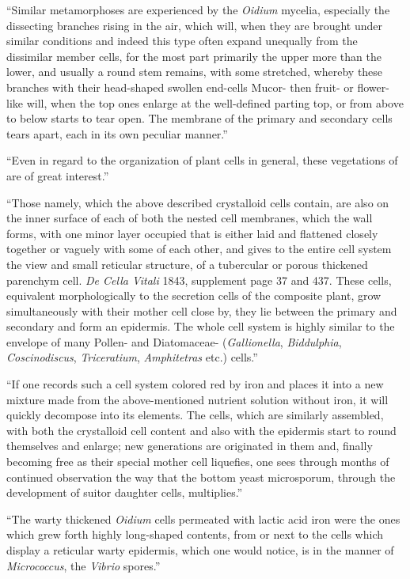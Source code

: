 \documentclass[a4paper, 12pt, oneside]{article}
\begin{document}
``Similar metamorphoses are experienced by the \emph{Oidium} mycelia, especially the dissecting branches rising in the air, which will, when they are brought under similar conditions and indeed this type often expand unequally from the dissimilar member cells, for the most part primarily the upper more than the lower, and usually a round stem remains, with some stretched, whereby these branches with their head-shaped swollen end-cells Mucor- then fruit- or flower-like will, when the top ones enlarge at the well-defined parting top, or from above to below starts to tear open. The membrane of the primary and secondary cells tears apart, each in its own peculiar manner.''

``Even in regard to the organization of plant cells in general, these vegetations of are of great interest.''

``Those namely, which the above described crystalloid cells contain, are also on the inner surface of each of both the nested cell membranes, which the wall forms, with one minor layer occupied that is either laid and flattened closely together or vaguely with some of each other, and gives to the entire cell system the view and small reticular structure, of a tubercular or porous thickened parenchym cell. \emph{De Cella Vitali} 1843, supplement page 37 and 437. These cells, equivalent morphologically to the secretion cells of the composite plant, grow simultaneously with their mother cell close by, they lie between the primary and secondary and form an epidermis. The whole cell system is highly similar to the envelope of many Pollen- and Diatomaceae- (\emph{Gallionella}, \emph{Biddulphia}, \emph{Coscinodiscus}, \emph{Triceratium}, \emph{Amphitetras} etc.) cells.''

``If one records such a cell system colored red by iron and places it into a new mixture made from the above-mentioned nutrient solution without iron, it will quickly decompose into its elements. The cells, which are similarly assembled, with both the crystalloid cell content and also with the epidermis start to round themselves and enlarge; new generations are originated in them and, finally becoming free as their special mother cell liquefies, one sees through months of continued observation the way that the bottom yeast microsporum, through the development of suitor daughter cells, multiplies.''

``The warty thickened \emph{Oidium} cells permeated with lactic acid iron were the ones which grew forth highly long-shaped contents, from or next to the cells which display a reticular warty epidermis, which one would notice, is in the manner of \emph{Micrococcus}, the \emph{Vibrio} spores.''
\end{document}
